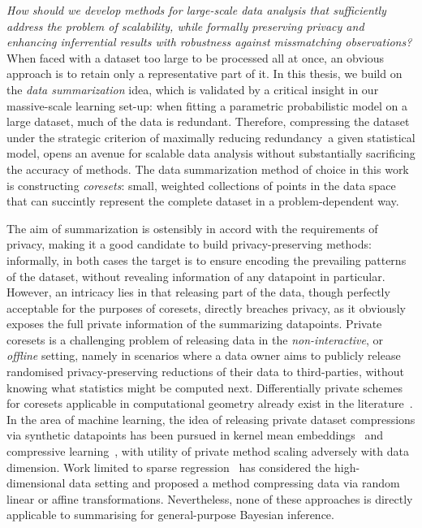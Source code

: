 \emph{How should we develop methods for large-scale data analysis that sufficiently address the problem of scalability, while formally preserving privacy and enhancing inferrential results with robustness against missmatching observations?} When faced with a dataset too large to be processed all at once, an obvious approach is to retain only a representative part of it. In this thesis, we build on the \emph{data summarization} idea, which is validated by a critical insight in our massive-scale learning set-up: when fitting a parametric probabilistic model on a large dataset, much of the data is redundant. Therefore, compressing the dataset under the strategic criterion of maximally reducing redundancy~\wrt a given statistical model, opens an avenue for scalable data analysis without substantially sacrificing the accuracy of methods. The data summarization method of choice in this work is constructing \emph{coresets}: small, weighted collections of points in the data space that can succintly represent the complete dataset in a problem-dependent way. 

The aim of summarization is ostensibly in accord with the requirements of privacy, making it a good candidate to build privacy-preserving methods: informally, in both cases the target is to ensure encoding the prevailing patterns of the dataset, without revealing information of any datapoint in particular. However, an intricacy lies in that releasing part of the data, though perfectly acceptable for the purposes of coresets, directly breaches privacy, as it obviously exposes the full private information of the summarizing datapoints. Private coresets is a challenging problem of releasing data in the \emph{non-interactive}, or \emph{offline} setting, namely in scenarios where a data owner aims to publicly release randomised privacy-preserving reductions of their data to third-parties, without knowing what statistics might be computed next. Differentially private schemes for coresets applicable in computational geometry already exist in the literature~\citep{feldman09,feldman17}. In the area of machine learning, the idea of releasing private dataset compressions via synthetic datapoints has been pursued in kernel mean embeddings~\citep{balog18} and compressive learning~\citep{schellekens19}, with utility of private method scaling adversely with data dimension. Work limited to sparse regression~\citep{zhou08} has considered the high-dimensional data setting and proposed a method compressing data via random linear or affine transformations. Nevertheless, none of these approaches is directly applicable to summarising for general-purpose Bayesian inference. 

